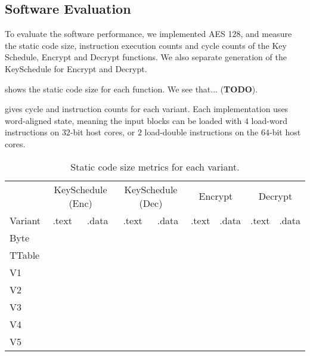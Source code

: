 
\subsection{Software Evaluation}
\label{sec:eval:sw}

To evaluate the software performance, we implemented AES 128, and
measure the static code size, instruction execution counts and cycle
counts of the Key Schedule, Encrypt and Decrypt functions.
We also separate generation of the KeySchedule for Encrypt and Decrypt.

 shows the static code size for each
function.
We see that... ({\bf TODO}).

 gives cycle and instruction counts for each
variant.
Each implementation uses word-aligned state, meaning the input blocks
can be loaded with $4$ load-word instructions on $32$-bit host cores,
or $2$ load-double instructions on the $64$-bit host cores.

\begin{table}
\centering
\begin{tabular}{l|cc|cc|cc|cc}
 &
\multicolumn{2}{c}{KeySchedule (Enc)} &
\multicolumn{2}{c}{KeySchedule (Dec)} &
\multicolumn{2}{c}{Encrypt} &
\multicolumn{2}{c}{Decrypt}  \\
Variant & .text & .data & .text & .data & .text & .data & .text & .data  \\ \hline
Byte    &       &       &       &       &       &       &       &        \\
TTable  &       &       &       &       &       &       &       &        \\
V1      &       &       &       &       &       &       &       &        \\
V2      &       &       &       &       &       &       &       &        \\
V3      &       &       &       &       &       &       &       &        \\
V4      &       &       &       &       &       &       &       &        \\
V5      &       &       &       &       &       &       &       &        \\
\end{tabular}
\caption{
Static code size metrics for each variant.
}
\label{tab:eval:sw:size}
\end{table}


